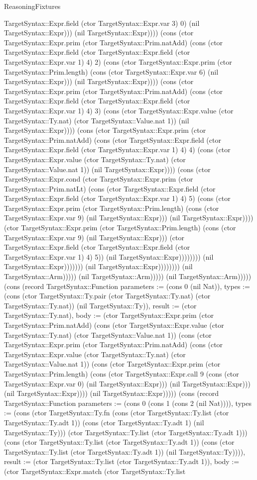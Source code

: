\begin{lexlean}{ReasoningFixtures}
\begin{semanticmodule}
{TargetSyntax::Expr.field (ctor TargetSyntax::Expr.var 3) 0) (nil TargetSyntax::Expr))) (nil TargetSyntax::Expr)))) (cons (ctor TargetSyntax::Expr.prim (ctor TargetSyntax::Prim.natAdd) (cons (ctor TargetSyntax::Expr.field (ctor TargetSyntax::Expr.field (ctor TargetSyntax::Expr.var 1) 4) 2) (cons (ctor TargetSyntax::Expr.prim (ctor TargetSyntax::Prim.length) (cons (ctor TargetSyntax::Expr.var 6) (nil TargetSyntax::Expr))) (nil TargetSyntax::Expr)))) (cons (ctor TargetSyntax::Expr.prim (ctor TargetSyntax::Prim.natAdd) (cons (ctor TargetSyntax::Expr.field (ctor TargetSyntax::Expr.field (ctor TargetSyntax::Expr.var 1) 4) 3) (cons (ctor TargetSyntax::Expr.value (ctor TargetSyntax::Ty.nat) (ctor TargetSyntax::Value.nat 1)) (nil TargetSyntax::Expr)))) (cons (ctor TargetSyntax::Expr.prim (ctor TargetSyntax::Prim.natAdd) (cons (ctor TargetSyntax::Expr.field (ctor TargetSyntax::Expr.field (ctor TargetSyntax::Expr.var 1) 4) 4) (cons (ctor TargetSyntax::Expr.value (ctor TargetSyntax::Ty.nat) (ctor TargetSyntax::Value.nat 1)) (nil TargetSyntax::Expr)))) (cons (ctor TargetSyntax::Expr.cond (ctor TargetSyntax::Expr.prim (ctor TargetSyntax::Prim.natLt) (cons (ctor TargetSyntax::Expr.field (ctor TargetSyntax::Expr.field (ctor TargetSyntax::Expr.var 1) 4) 5) (cons (ctor TargetSyntax::Expr.prim (ctor TargetSyntax::Prim.length) (cons (ctor TargetSyntax::Expr.var 9) (nil TargetSyntax::Expr))) (nil TargetSyntax::Expr)))) (ctor TargetSyntax::Expr.prim (ctor TargetSyntax::Prim.length) (cons (ctor TargetSyntax::Expr.var 9) (nil TargetSyntax::Expr))) (ctor TargetSyntax::Expr.field (ctor TargetSyntax::Expr.field (ctor TargetSyntax::Expr.var 1) 4) 5)) (nil TargetSyntax::Expr)))))))) (nil TargetSyntax::Expr))))))) (nil TargetSyntax::Expr)))))))) (nil TargetSyntax::Arm))))) (nil TargetSyntax::Arm))))) (nil TargetSyntax::Arm))))}) (cons (record TargetSyntax::Function {parameters := (cons 0 (nil Nat)), types := (cons (ctor TargetSyntax::Ty.pair (ctor TargetSyntax::Ty.nat) (ctor TargetSyntax::Ty.nat)) (nil TargetSyntax::Ty)), result := (ctor TargetSyntax::Ty.nat), body := (ctor TargetSyntax::Expr.prim (ctor TargetSyntax::Prim.natAdd) (cons (ctor TargetSyntax::Expr.value (ctor TargetSyntax::Ty.nat) (ctor TargetSyntax::Value.nat 1)) (cons (ctor TargetSyntax::Expr.prim (ctor TargetSyntax::Prim.natAdd) (cons (ctor TargetSyntax::Expr.value (ctor TargetSyntax::Ty.nat) (ctor TargetSyntax::Value.nat 1)) (cons (ctor TargetSyntax::Expr.prim (ctor TargetSyntax::Prim.length) (cons (ctor TargetSyntax::Expr.call 9 (cons (ctor TargetSyntax::Expr.var 0) (nil TargetSyntax::Expr))) (nil TargetSyntax::Expr))) (nil TargetSyntax::Expr)))) (nil TargetSyntax::Expr))))}) (cons (record TargetSyntax::Function {parameters := (cons 0 (cons 1 (cons 2 (nil Nat)))), types := (cons (ctor TargetSyntax::Ty.fn (cons (ctor TargetSyntax::Ty.list (ctor TargetSyntax::Ty.adt 1)) (cons (ctor TargetSyntax::Ty.adt 1) (nil TargetSyntax::Ty))) (ctor TargetSyntax::Ty.list (ctor TargetSyntax::Ty.adt 1))) (cons (ctor TargetSyntax::Ty.list (ctor TargetSyntax::Ty.adt 1)) (cons (ctor TargetSyntax::Ty.list (ctor TargetSyntax::Ty.adt 1)) (nil TargetSyntax::Ty)))), result := (ctor TargetSyntax::Ty.list (ctor TargetSyntax::Ty.adt 1)), body := (ctor TargetSyntax::Expr.match (ctor TargetSyntax::Ty.list }
\end{semanticmodule}
\end{lexlean}
